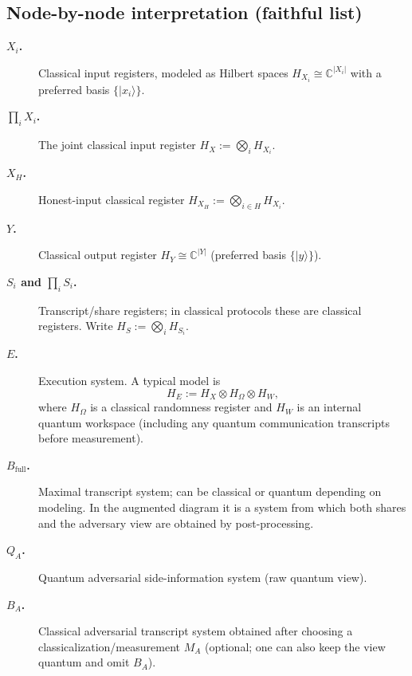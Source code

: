 \documentclass[11pt,a4paper]{article}
\theoremstyle{definition}
\theoremstyle{plain}
\begin{document}
\subsection{Node-by-node interpretation (faithful list)}
\begin{description}
    \item[\textbf{$X_i$.}] Classical input registers, modeled as Hilbert spaces $H_{X_i}\cong \mathbb{C}^{|X_i|}$ with a preferred basis $\{\lvert x_i\rangle\}$.
    \item[\textbf{$\prod_i X_i$.}] The joint classical input register $H_{X}:=\bigotimes_i H_{X_i}$.
    \item[\textbf{$X_H$.}] Honest-input classical register $H_{X_H}:=\bigotimes_{i\in H} H_{X_i}$.
    \item[\textbf{$Y$.}] Classical output register $H_Y\cong \mathbb{C}^{|Y|}$ (preferred basis $\{\lvert y\rangle\}$).
    \item[\textbf{$S_i$ and $\prod_i S_i$.}] Transcript/share registers; in classical protocols these are classical registers. Write $H_S:=\bigotimes_i H_{S_i}$.
    \item[\textbf{$E$.}] Execution system. A typical model is
    \[
    H_E := H_X \otimes H_\Omega \otimes H_W,
    \]
    where $H_\Omega$ is a classical randomness register and $H_W$ is an internal quantum workspace (including any quantum communication transcripts before measurement).
    \item[\textbf{$B_{\mathrm{full}}$.}] Maximal transcript system; can be classical or quantum depending on modeling. In the augmented diagram it is a system from which both shares and the adversary view are obtained by post-processing.
    \item[\textbf{$Q_A$.}] Quantum adversarial side-information system (raw quantum view).
    \item[\textbf{$B_A$.}] Classical adversarial transcript system obtained after choosing a classicalization/measurement $M_A$ (optional; one can also keep the view quantum and omit $B_A$).
\end{description}
\end{document}
